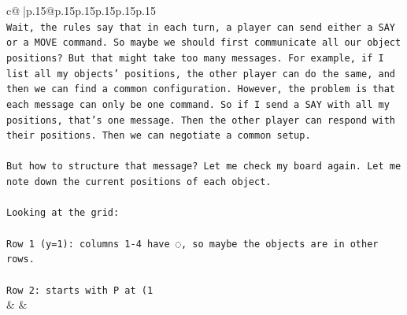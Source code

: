 \documentclass{article}
\begin{document}
{\begin{supertabular}{c@{$\;$}|p{.15\linewidth}@{}p{.15\linewidth}p{.15\linewidth}p{.15\linewidth}p{.15\linewidth}p{.15\linewidth}}
{{{\\ 
\texttt{Wait, the rules say that in each turn, a player can send either a SAY or a MOVE command. So maybe we should first communicate all our object positions? But that might take too many messages. For example, if I list all my objects' positions, the other player can do the same, and then we can find a common configuration. However, the problem is that each message can only be one command. So if I send a SAY with all my positions, that's one message. Then the other player can respond with their positions. Then we can negotiate a common setup. } \\
\\ 
\texttt{But how to structure that message? Let me check my board again. Let me note down the current positions of each object. } \\
\\ 
\texttt{Looking at the grid:} \\
\\ 
\texttt{Row 1 (y=1): columns 1{-}4 have ◌, so maybe the objects are in other rows. } \\
\\ 
\texttt{Row 2: starts with P at (1} \\
            }
        }
    }
    & & \\ \\


\end{supertabular}}
\end{document}
